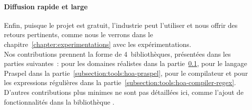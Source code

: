 \paragraph{Diffusion rapide et large} Enfin, puisque le projet est gratuit,
l'industrie peut l'utiliser et nous offrir des retours pertinents, comme nous le
verrons dans le chapitre~\ref{chapter:experimentations} avec les
expérimentations. \\

Nos contributions prennent la forme de 4~bibliothèques, présentées dans les
parties suivantes~:  pour les domaines réalistes
dans la partie~\ref{subsection:tools:hoa-realdom}, 
pour le langage Praspel dans la partie~\ref{subsection:tools:hoa-praspel},
 pour le compilateur et
 pour les expressions régulières dans la
partie~\ref{subsection:tools:hoa-compiler-regex}. D'autres contributions plus
minimes ne sont pas détaillées ici, comme l'ajout de fonctionnalités dans la
bibliothèque .

\subsection{}
\label{subsection:tools:hoa-realdom}

